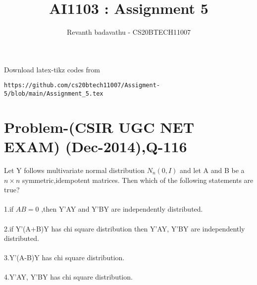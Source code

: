 \documentclass[journal,12pt,twocolumn]{IEEEtran}
\begin{document}
\let\vec\mathbf
\renewcommand{\thefigure}{\theproblem}
\def\putbox#1#2#3{\makebox[0in][l]{\makebox[#1][l]{}\raisebox{\baselineskip}[0in][0in]{\raisebox{#2}[0in][0in]{#3}}}}
     \def\rightbox#1{\makebox[0in][r]{#1}}
     \def\centbox#1{\makebox[0in]{#1}}
     \def\topbox#1{\raisebox{-\baselineskip}[0in][0in]{#1}}
     \def\midbox#1{\raisebox{-0.5\baselineskip}[0in][0in]{#1}}
\vspace{3cm}
\title{AI1103 : Assignment 5}
\author{Revanth badavathu - CS20BTECH11007}
\maketitle
\newpage
\bigskip
\renewcommand{\thefigure}{\arabic{figure}}
\renewcommand{\thetable}{\arabic{table}}

 Download latex-tikz codes from 
%
\begin{lstlisting}
https://github.com/cs20btech11007/Assigment-5/blob/main/Assignment_5.tex
\end{lstlisting}
\section*{\textbf{Problem-(CSIR UGC NET EXAM) (Dec-2014),Q-116}}
Let Y follows multivariate normal distribution $N_{n}(0,I)$ and let A and B be a $n\times n$ symmetric,idempotent matrices. Then which of the following statements are true? \\
\\1.if $AB=0$ ,then Y'AY and Y'BY are independently distributed.\\
\\2.if Y'(A+B)Y has chi square distribution then Y'AY, Y'BY are independently distributed.\\
\\3.Y'(A-B)Y has chi square distribution.\\
\\4.Y'AY, Y'BY has chi square distribution.\\
\end{document}
